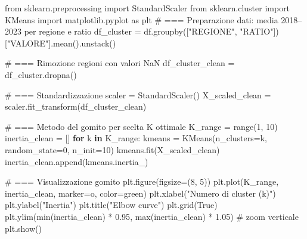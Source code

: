 \documentclass[
  letterpaper,
  DIV=11,
  numbers=noendperiod]{scrartcl}
\newenvironment{Shaded}{\begin{snugshade}}{\end{snugshade}}
\newcommand{\BuiltInTok}[1]{\textcolor[rgb]{0.00,0.23,0.31}{#1}}
\newcommand{\CommentTok}[1]{\textcolor[rgb]{0.37,0.37,0.37}{#1}}
\newcommand{\ControlFlowTok}[1]{\textcolor[rgb]{0.00,0.23,0.31}{\textbf{#1}}}
\newcommand{\DecValTok}[1]{\textcolor[rgb]{0.68,0.00,0.00}{#1}}
\newcommand{\FloatTok}[1]{\textcolor[rgb]{0.68,0.00,0.00}{#1}}
\newcommand{\ImportTok}[1]{\textcolor[rgb]{0.00,0.46,0.62}{#1}}
\newcommand{\KeywordTok}[1]{\textcolor[rgb]{0.00,0.23,0.31}{\textbf{#1}}}
\newcommand{\NormalTok}[1]{\textcolor[rgb]{0.00,0.23,0.31}{#1}}
\newcommand{\OperatorTok}[1]{\textcolor[rgb]{0.37,0.37,0.37}{#1}}
\newcommand{\StringTok}[1]{\textcolor[rgb]{0.13,0.47,0.30}{#1}}
\newcommand{\VariableTok}[1]{\textcolor[rgb]{0.07,0.07,0.07}{#1}}
\begin{document}
\label{fig1}
\begin{Shaded}
\begin{Highlighting}[]
\ImportTok{from}\NormalTok{ sklearn.preprocessing }\ImportTok{import}\NormalTok{ StandardScaler}
\ImportTok{from}\NormalTok{ sklearn.cluster }\ImportTok{import}\NormalTok{ KMeans}
\ImportTok{import}\NormalTok{ matplotlib.pyplot }\ImportTok{as}\NormalTok{ plt}
\CommentTok{\# === Preparazione dati: media 2018–2023 per regione e ratio}
\NormalTok{df\_cluster }\OperatorTok{=}\NormalTok{ df.groupby([}\StringTok{"REGIONE"}\NormalTok{, }\StringTok{"RATIO"}\NormalTok{])[}\StringTok{"VALORE"}\NormalTok{].mean().unstack()}

\CommentTok{\# === Rimozione regioni con valori NaN}
\NormalTok{df\_cluster\_clean }\OperatorTok{=}\NormalTok{ df\_cluster.dropna()}

\CommentTok{\# === Standardizzazione}
\NormalTok{scaler }\OperatorTok{=}\NormalTok{ StandardScaler()}
\NormalTok{X\_scaled\_clean }\OperatorTok{=}\NormalTok{ scaler.fit\_transform(df\_cluster\_clean)}

\CommentTok{\# === Metodo del gomito per scelta K ottimale}
\NormalTok{K\_range }\OperatorTok{=} \BuiltInTok{range}\NormalTok{(}\DecValTok{1}\NormalTok{, }\DecValTok{10}\NormalTok{)}
\NormalTok{inertia\_clean }\OperatorTok{=}\NormalTok{ []}
\ControlFlowTok{for}\NormalTok{ k }\KeywordTok{in}\NormalTok{ K\_range:}
\NormalTok{    kmeans }\OperatorTok{=}\NormalTok{ KMeans(n\_clusters}\OperatorTok{=}\NormalTok{k, random\_state}\OperatorTok{=}\DecValTok{0}\NormalTok{, n\_init}\OperatorTok{=}\DecValTok{10}\NormalTok{)}
\NormalTok{    kmeans.fit(X\_scaled\_clean)}
\NormalTok{    inertia\_clean.append(kmeans.inertia\_)}

\CommentTok{\# === Visualizzazione gomito}
\NormalTok{plt.figure(figsize}\OperatorTok{=}\NormalTok{(}\DecValTok{8}\NormalTok{, }\DecValTok{5}\NormalTok{))}
\NormalTok{plt.plot(K\_range, inertia\_clean, marker}\OperatorTok{=}\StringTok{\textquotesingle{}o\textquotesingle{}}\NormalTok{, color}\OperatorTok{=}\StringTok{\textquotesingle{}green\textquotesingle{}}\NormalTok{)}
\NormalTok{plt.xlabel(}\StringTok{"Numero di cluster (k)"}\NormalTok{)}
\NormalTok{plt.ylabel(}\StringTok{"Inertia"}\NormalTok{)}
\NormalTok{plt.title(}\StringTok{"Elbow curve"}\NormalTok{)}
\NormalTok{plt.grid(}\VariableTok{True}\NormalTok{)}
\NormalTok{plt.ylim(}\BuiltInTok{min}\NormalTok{(inertia\_clean) }\OperatorTok{*} \FloatTok{0.95}\NormalTok{, }\BuiltInTok{max}\NormalTok{(inertia\_clean) }\OperatorTok{*} \FloatTok{1.05}\NormalTok{)  }\CommentTok{\# zoom verticale}
\NormalTok{plt.show()}
\end{Highlighting}
\end{Shaded}
\end{document}
